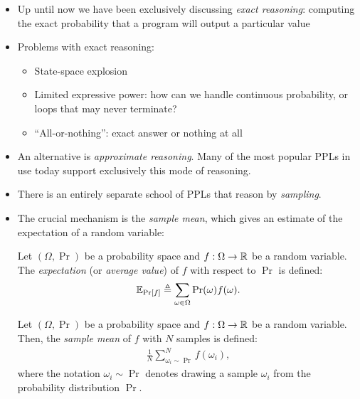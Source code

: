 \documentclass{tufte-handout}
\begin{document}
\begin{itemize}
  \item Up until now we have been exclusively discussing \emph{exact reasoning}:
  computing the exact probability that a program will output a particular value

  \item Problems with exact reasoning:
  \begin{itemize}
    \item State-space explosion
    \item Limited expressive power: how can we handle continuous probability, or loops that may never terminate?
    \item ``All-or-nothing'': exact answer or nothing at all
  \end{itemize}

  \item An alternative is \emph{approximate reasoning}. Many of the most popular PPLs in use 
  today support exclusively this mode of reasoning.

  \item There is an entirely separate school of PPLs that reason by \emph{sampling}.

  \item The crucial mechanism is the \emph{sample mean}, which gives an estimate of the expectation 
  of a random variable:
  
  \begin{definition}[Expectation]
    Let $(\Omega, \Pr)$ be a probability space and $f : \Omega \rightarrow
    \mathbb{R}$ be a random variable. The \emph{expectation} (or \emph{average value}) of $f$ with respect to 
    $\Pr$ is defined:
    \begin{align}
      \mathbb{E}_{\Pr[f]} \triangleq \sum_{\omega \in \Omega} \Pr(\omega) f(\omega).
    \end{align}
  \end{definition}

  \begin{definition}
    Let $(\Omega, \Pr)$ be a probability space and $f : \Omega \rightarrow
    \mathbb{R}$ be a random variable. Then, the \emph{sample mean} of $f$ 
    with $N$ samples is defined:
    \begin{align}
      \frac{1}{N} \sum_{\omega_i \sim \Pr}^N f(\omega_i),
    \end{align}
    where the notation $\omega_i \sim \Pr$ denotes drawing a sample $\omega_i$ from 
    the probability distribution $\Pr$.
  \end{definition}


\end{itemize}
\end{document}
